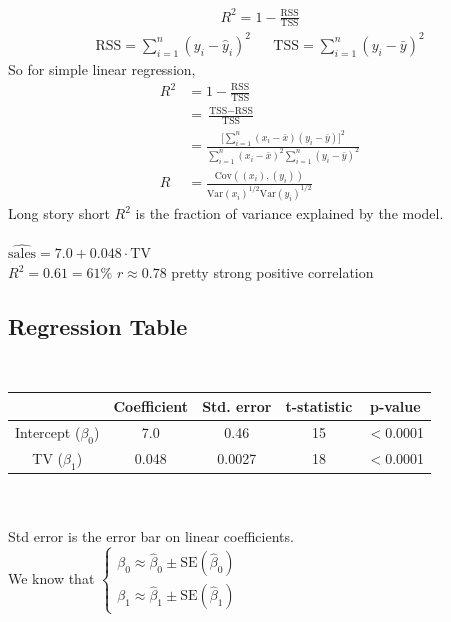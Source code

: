 \documentclass[12pt, letterpaper]{article}
\begin{document}
\begin{align*}
    R^2 = 1 - \frac{\text{RSS}}{\text{TSS}}
\end{align*}
\begin{align*}
    \text{RSS} = \sum_{i=1}^{n}(y_i - \hat y_i)^2 & & \text{TSS} = \sum_{i=1}^{n}(y_i - \bar y )^2
\end{align*}
\noindent So for simple linear regression,
\begin{align*}
    R^2 &= 1 - \frac{\text{RSS}}{\text{TSS}} \\
    &= \frac{\text{TSS} - \text{RSS}}{\text{TSS}} \\ 
    &= \frac{\Big[ \sum_{i=1}^{n}(x_i - \bar x) (y_i - \bar y) \Big]^2}{\sum_{i=1}^{n}(x_i - \bar x)^2 \sum_{i=1}^{n}(y_i - \bar y)^2} \\
    R & = \frac{\text{Cov}((x_i),(y_i))}{\text{Var}(x_i)^{1/2}\text{Var}(y_i)^{1/2}}
\end{align*}
Long story short $R^2$ is the fraction of variance explained by the model. \\ \\
 \quad $\hat{\text{sales}} = 7.0 + 0.048 \cdot\text{TV}$ \\
$R^2 = 0.61 = 61\%$ \qquad $r \approx 0.78$ pretty strong positive correlation

\subsection{Regression Table}
 \\
\begin{tabular}{c|c c c c}
    & Coefficient & Std. error & t-statistic & p-value \\
    \hline
    Intercept ($\beta_0$) & 7.0 & 0.46 & 15 & $<$0.0001\\
    TV ($\beta_1$)& 0.048 & 0.0027 & 18 & $<$0.0001
\end{tabular} \\ \\
Std error is the error bar on linear coefficients. \\ 

We know that $\begin{cases}
    \beta_0 \approx \hat \beta_0 \pm \text{SE}(\hat\beta_0) \\
    \beta_1 \approx \hat \beta_1 \pm \text{SE}(\hat\beta_1) 
\end{cases}$ \\ 
\end{document}
